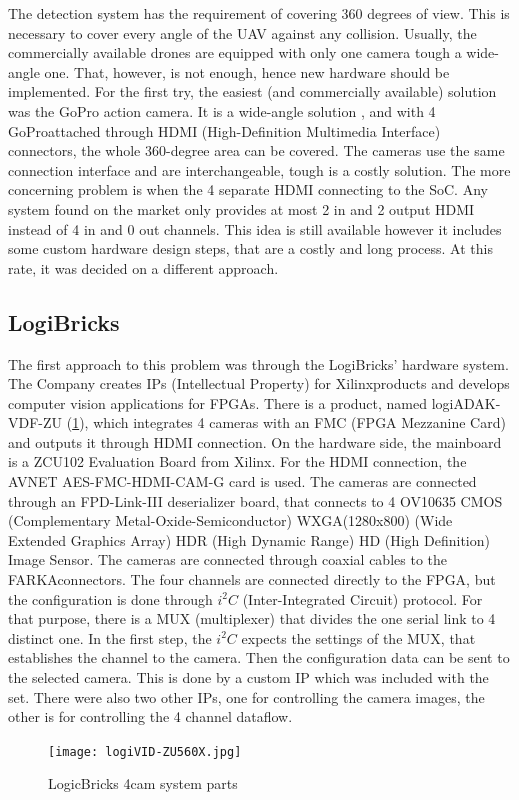 The detection system has the requirement of covering 360 degrees of view.
This is necessary to cover every angle of the UAV against any collision.
Usually, the commercially available drones are equipped with only one camera tough a wide-angle one.
That, however, is not enough, hence new hardware should be implemented.
For the first try, the easiest (and commercially available) solution was the GoPro\texttrademark \cite{GoPro} action camera.
It is a wide-angle solution \cite{GoPro_resolutions}, and with 4 GoPro\texttrademark attached through HDMI (High-Definition Multimedia Interface) connectors, the whole 360-degree area can be covered.
The cameras use the same connection interface and are interchangeable, tough is a costly solution.
The more concerning problem is when the 4 separate HDMI connecting to the SoC.
Any system found on the market only provides at most 2 in and 2 output HDMI instead of 4 in and 0 out channels.
This idea is still available however it includes some custom hardware design steps, that are a costly and long process.
At this rate, it was decided on a different approach.

\subsection{LogiBricks} \label{sec:logibricks} %
The first approach to this problem was through the LogiBricks'\texttrademark \cite{Logibricks} hardware system.
The Company creates IPs (Intellectual Property) for Xilinx\texttrademark products and develops computer vision applications for FPGAs.
There is a product, named logiADAK-VDF-ZU\texttrademark \cite{logiVID-ZU} (\cref{fig:logic_4cam}), which integrates 4 cameras with an FMC (FPGA Mezzanine Card) and outputs it through HDMI connection.
On the hardware side, the mainboard is a ZCU102 Evaluation Board \cite{ZCU102} from Xilinx.
For the HDMI connection, the AVNET\texttrademark \cite{AvNet} AES-FMC-HDMI-CAM-G card is used.
The cameras are connected through an FPD-Link-III deserializer board, that connects to 4 OV10635 \cite{Omnivision} CMOS (Complementary Metal-Oxide-Semiconductor) WXGA(1280x800) (Wide Extended Graphics Array) HDR (High Dynamic Range) HD (High Definition) Image Sensor.
The cameras are connected through coaxial cables to the FARKA\texttrademark connectors.
The four channels are connected directly to the FPGA, but the configuration is done through $i^2C$ (Inter-Integrated Circuit) protocol.
For that purpose, there is a MUX (multiplexer) that divides the one serial link to 4 distinct one.
In the first step, the $i^2C$ expects the settings of the MUX, that establishes the channel to the camera.
Then the configuration data can be sent to the selected camera.
This is done by a custom IP which was included with the set.
There were also two other IPs, one for controlling the camera images, the other is for controlling the 4 channel dataflow.
\begin{figure}
    \centering
    \texttt{[image: logiVID-ZU560X.jpg]}
    \caption{LogicBricks 4cam system parts \cite{logi_4cam_img}}
    \label{fig:logic_4cam}
\end{figure}

